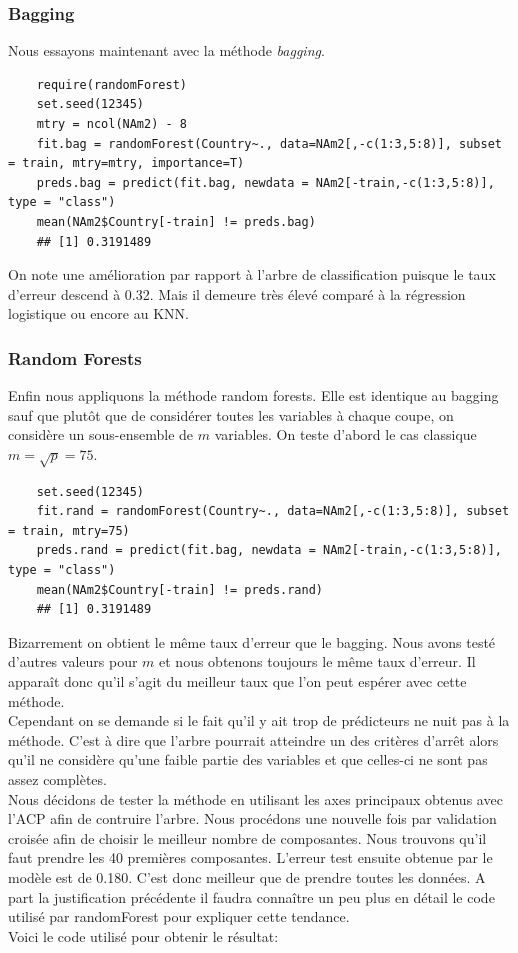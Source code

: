 \documentclass[12pt,a4paper]{article}
\begin{document}
\subsubsection{Bagging}
Nous essayons maintenant avec la méthode \textit{bagging}.\vspace{2mm}
\begin{lstlisting}
	require(randomForest)
	set.seed(12345)
	mtry = ncol(NAm2) - 8
	fit.bag = randomForest(Country~., data=NAm2[,-c(1:3,5:8)], subset = train, mtry=mtry, importance=T)
	preds.bag = predict(fit.bag, newdata = NAm2[-train,-c(1:3,5:8)], type = "class")
	mean(NAm2$Country[-train] != preds.bag)
	## [1] 0.3191489
\end{lstlisting}
On note une amélioration par rapport à l'arbre de classification puisque le taux d'erreur descend à 0.32. Mais il demeure très élevé comparé à la régression logistique ou encore au KNN.
\subsubsection{Random Forests}
Enfin nous appliquons la méthode random forests. Elle est identique au bagging sauf que plutôt que de considérer toutes les variables à chaque coupe, on considère un sous-ensemble de $m$ variables. On teste d'abord le cas classique $m=\sqrt{p} = 75$.\vspace{2mm}
\begin{lstlisting}
	set.seed(12345)
	fit.rand = randomForest(Country~., data=NAm2[,-c(1:3,5:8)], subset = train, mtry=75)
	preds.rand = predict(fit.bag, newdata = NAm2[-train,-c(1:3,5:8)], type = "class")
	mean(NAm2$Country[-train] != preds.rand)
	## [1] 0.3191489
\end{lstlisting}
Bizarrement on obtient le même taux d'erreur que le bagging. Nous avons testé
d'autres valeurs pour $m$ et nous obtenons toujours le même taux d'erreur. Il
apparaît donc qu'il s'agit du meilleur taux que l'on peut espérer avec cette
méthode. \\
Cependant on se demande si le fait qu'il y ait trop de prédicteurs ne nuit pas
à la méthode. C'est à dire que l'arbre pourrait atteindre un des critères d'arrêt
alors qu'il ne considère qu'une faible partie des variables et que celles-ci ne
sont pas assez complètes. \\
Nous décidons de tester la méthode en utilisant les axes principaux obtenus avec 
l'ACP afin de contruire l'arbre. Nous procédons une nouvelle fois par validation
croisée afin de choisir le meilleur nombre de composantes. Nous trouvons qu'il 
faut prendre les 40 premières composantes. L'erreur test ensuite obtenue par le
modèle est de 0.180. C'est donc meilleur que de prendre toutes les données. A 
part la justification précédente il faudra connaître un peu plus en détail le
code utilisé par randomForest pour expliquer cette tendance. \\
Voici le code utilisé pour obtenir le résultat:
\end{document}
